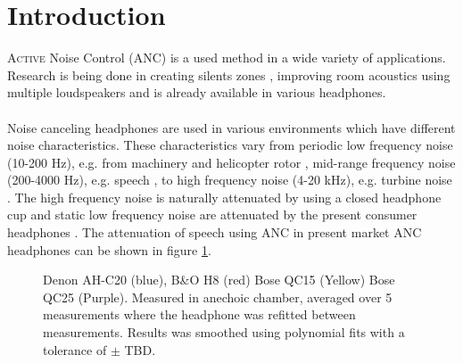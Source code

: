 \section*{Introduction}
\lettrine[lines=2]{A}{ctive} Noise Control 
(ANC) is a used method in a wide variety of applications. Research is being done in creating silents zones \cite{SilentZones}, improving room acoustics using multiple loudspeakers \cite{CAPS} and is already available in various headphones.
\\\\
Noise canceling headphones are used in various environments which have different noise characteristics. These characteristics vary from periodic low frequency noise (10-200 Hz), e.g. from machinery and helicopter rotor \cite{LowFrequency}, mid-range frequency noise (200-4000 Hz), e.g. speech \cite{MidFrequency}, to high frequency noise (4-20 kHz), e.g. turbine noise \cite{LowFrequency}. The high frequency noise is naturally attenuated by using a closed headphone cup \cite{naturalAttenuation} and static low frequency noise are attenuated by the present consumer headphones \cite{naturalAttenuation}. The attenuation of speech using ANC in present market ANC headphones can be shown in figure \ref{fig:ANCcompare}.


\begin{figure}[H]
	\centering
	
	\caption{Denon AH-C20 (blue), B\&O H8 (red) Bose QC15 (Yellow) Bose QC25 (Purple). Measured in anechoic chamber, averaged over 5 measurements where the headphone was refitted between measurements. Results was smoothed using polynomial fits with a tolerance of $\pm$ TBD.}
	\label{fig:ANCcompare}
\end{figure}

